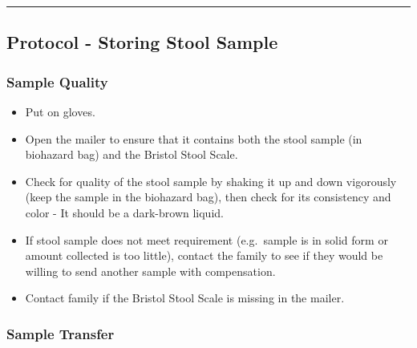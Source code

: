 \documentclass[]{book}
\begin{document}
\begin{center}\rule{0.5\linewidth}{0.5pt}\end{center}

\hypertarget{protocol---storing-stool-sample-1}{%
\subsection{Protocol - Storing Stool Sample}\label{protocol---storing-stool-sample-1}}

\hypertarget{sample-quality-2}{%
\subsubsection{Sample Quality}\label{sample-quality-2}}

\begin{itemize}
\item
  Put on gloves.
\item
  Open the mailer to ensure that it contains both the stool sample (in biohazard bag) and the Bristol Stool Scale.
\item
  Check for quality of the stool sample by shaking it up and down vigorously (keep the sample in the biohazard bag), then check for its consistency and color - It should be a dark-brown liquid.
\item
  If stool sample does not meet requirement (e.g.~sample is in solid form or amount collected is too little), contact the family to see if they would be willing to send another sample with compensation.
\item
  Contact family if the Bristol Stool Scale is missing in the mailer.
\end{itemize}

\hypertarget{sample-transfer-2}{%
\subsubsection{Sample Transfer}\label{sample-transfer-2}}
\end{document}
